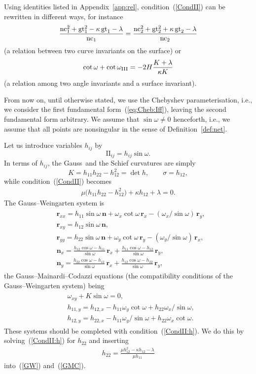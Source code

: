 \documentclass[pdftex]{sigma}
\let\ve\mathbf
\def\II#1#2{\mathrm{II}_{#1#2}}
\def\h#1#2{h_{#1#2}}
\def\nc#1{{\mathop{\rm nc}}_{#1}}
\def\gtor#1{{{\rm gt}}_{#1}}
\def\omegaIII{\omega_{\hbox{\sc iii}}}
\def\f{\omega}
\def\m{\mu}
\def\k{\kappa}
\def\l{\lambda}
\def\eqref#1{{\rm(\ref{#1})}}
\numberwithin{equation}{section}
\begin{document}
\begin{Remark}\label{rem:CondII:ways}
Using identities listed in Appendix~\ref{app:rel},
condition~\eqref{CondII} can be rewritten in different ways, for instance
\[
\frac{\nc1^2 + \gtor1^2 - \kappa\,\gtor1 - \lambda}{\nc1}
 = \frac{\nc2^2 + \gtor2^2 + \kappa\,\gtor2 - \lambda}{\nc2}
\]
(a relation between two curve invariants on the surface) or
\[
\cot\omega + \cot\omegaIII
 = -2 H \frac{ K + \lambda}{\kappa K}
\]
(a relation among two angle invariants and a surface invariant).
\end{Remark}

From now on, until otherwise stated, we use the Chebyshev
parameterisation, i.e., we consider the first fundamental
form~\eqref{eq:Cheb:Iff}, leaving the second fundamental form arbitrary.
We assume that $\sin\f \ne 0$ henceforth, i.e., we assume that all points
are nonsingular in the sense of Definition~\ref{def:net}.

Let us introduce variables $\h ij$ by
\[
\II ij = \h ij \sin\f.
\]
In terms of $\h ij$, the Gauss\ and the Schief curvatures are simply
\[
K = \h11 \h22 - \h12^2 = \det h,
\qquad
\sigma = \h12,
\]
while condition~\eqref{CondII}  becomes
\begin{gather}\label{CondII:h}
\m \bigl(\h11 \h22 - \h12^2\bigr) + \k \h12 + \l = 0.
\end{gather}
The Gauss--Weingarten system is
\begin{gather}\label{GW}
\begin{split}
&\ve r_{xx} = \h11\sin\f\,\ve n + \f_x\cot\f\,\ve r_x - (\f_x/{\sin\f})\,\ve r_y, \\
&\ve r_{xy} = \h12 \sin\f\,\ve n, \\
&\ve r_{yy} = \h22 \sin\f\,\ve n + \f_y \cot\f\,\ve r_y - (\f_y/{\sin\f})\,\ve r_x, \\
&\ve n_x = \frac{\h12 \cos\f - \h11}{\sin\f}\,\ve r_x
 + \frac{\h11 \cos\f - \h12}{\sin\f}\,\ve r_y , \\
&\ve n_y = \frac{\h22 \cos\f - \h12}{\sin\f}\,\ve r_x
 + \frac{\h12 \cos\f - \h22}{\sin\f}\,\ve r_y,
\end{split}
\end{gather}
the Gauss--Mainardi--Codazzi equations
(the compatibility conditions of the Gauss--Weingarten system) being
\begin{gather}
\begin{split}
& \f_{xy} + K \sin\f = 0,  \\
&\h{11}{,y} = \h{12}{,x} - \h11 \f_y \cot\f + \h22 \f_x/{\sin\f},  \\
&\h{12}{,y} = \h{22}{,x} - \h11 \f_y/{\sin\f} + \h22 \f_x \cot\f.
\end{split}\label{GMC}
\end{gather}
These systems should be completed with condition~\eqref{CondII:h}.
We do this by solving~\eqref{CondII:h} for $\h22$ and inserting
\begin{gather}\label{eq:h22}
\h22 = \frac{\m \h12^2- \k\h12 -\l}{\m \h11}
\end{gather}
into~\eqref{GW} and~\eqref{GMC}.
\end{document}
